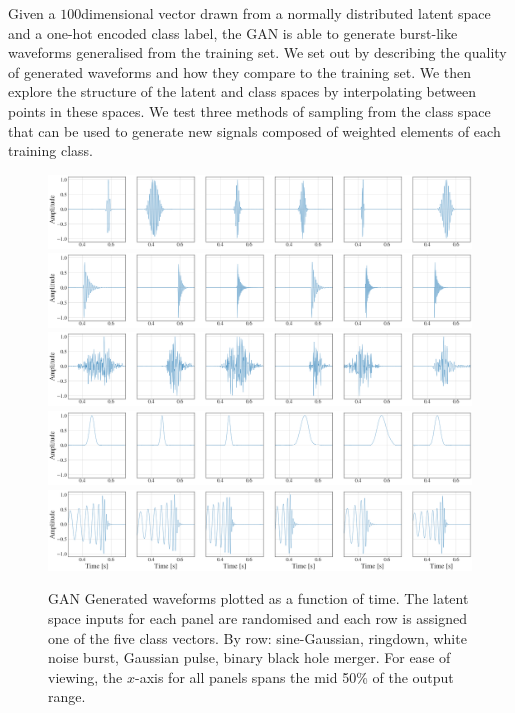\documentclass[12pt]{iopart}
\newcommand{\ndimensional}[1]{$#1$\nobreakdash\discretionary{-}{-}{-}dimensional}
\begin{document}
%
Given a \ndimensional{100} vector drawn from a normally distributed latent space and a one-hot encoded class
label, the GAN is able to generate burst-like waveforms generalised from the
training set. We set out by describing the quality of generated waveforms and
how they compare to the training set. We then explore the structure of the
latent and class spaces by interpolating between points in these spaces. We
test three methods of sampling from the class space that can be used to generate new signals composed of weighted elements of each training class.

\begin{figure}[!h]
    \centering
    \includegraphics[width=\textwidth]{figures/generations/sg.png}
    \includegraphics[width=\textwidth]{figures/generations/rd.png}
    \includegraphics[width=\textwidth]{figures/generations/wnb.png}
    \includegraphics[width=\textwidth]{figures/generations/blip.png}
    \includegraphics[width=\textwidth]{figures/generations/bbh.png}
    \caption{\ac{GAN} Generated waveforms plotted as a function of time. The latent space inputs for each panel are randomised and each row is assigned one of the five class vectors. By row: sine-Gaussian, ringdown,
white noise burst, Gaussian pulse, binary black hole merger. For ease of viewing, the $x$-axis for all panels spans the mid 50\% of the output range.}
\label{fig:gen_signals} 
\end{figure}
\end{document}
